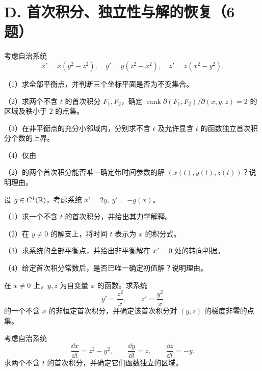 \section{D. 首次积分、独立性与解的恢复（6 题）}
\noindent\begin{minipage}{\linewidth}
考虑自治系统
\[x'=x(y^2-z^2),\quad y'=y(z^2-x^2),\quad z'=z(x^2-y^2).\]
\par（1）求全部平衡点，并判断三个坐标平面是否为不变集合。
\par（2）求两个不含 $t$ 的首次积分 $F_1,F_2$，确定 $\operatorname{rank}\partial(F_1,F_2)/\partial(x,y,z)=2$ 的区域及秩小于 $2$ 的点集。
\par（3）在非平衡点的充分小邻域内，分别求不含 $t$ 及允许显含 $t$ 的函数独立首次积分个数的上界。
\par（4）仅由\par（2）的两个首次积分能否唯一确定带时间参数的解 $(x(t),y(t),z(t))$？说明理由。
\end{minipage}\par\vspace{5pt}
\noindent\begin{minipage}{\linewidth}
设 $g\in C^1(\mathbb R)$，考虑系统 $x'=2y,\ y'=-g(x)$。
\par（1）求一个不含 $t$ 的首次积分，并给出其力学解释。
\par（2）在 $y\ne0$ 的解支上，将时间 $t$ 表示为 $x$ 的积分式。
\par（3）求系统的全部平衡点，并给出非平衡解在 $x'=0$ 处的转向判据。
\par（4）给定首次积分常数后，是否已唯一确定初值解？说明理由。
\end{minipage}\par\vspace{5pt}
\noindent\begin{minipage}{\linewidth}
在 $x\ne0$ 上，$y,z$ 为自变量 $x$ 的函数。求系统
\[y'=\frac{z^2}{x},\qquad z'=\frac{y^2}{x}\]
的一个不含 $x$ 的非恒定首次积分，并确定该首次积分对 $(y,z)$ 的梯度非零的点集。
\end{minipage}\par\vspace{5pt}
\noindent\begin{minipage}{\linewidth}
考虑自治系统
\[\frac{\dd x}{\dd t}=z^2-y^2,\qquad \frac{\dd y}{\dd t}=z,\qquad \frac{\dd z}{\dd t}=-y.\]
求两个不含 $t$ 的首次积分，并确定它们函数独立的区域。
\end{minipage}\par\vspace{5pt}
